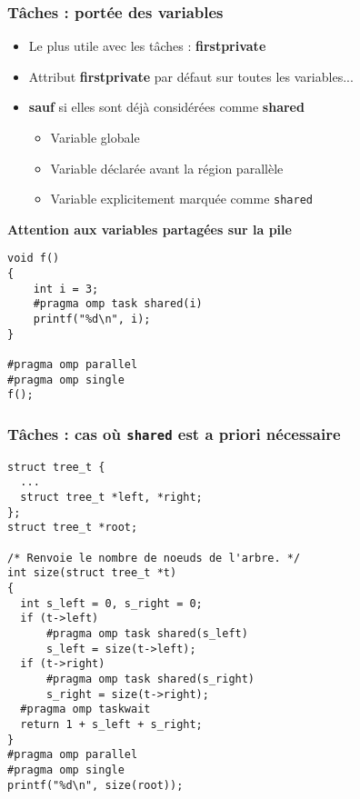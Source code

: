 \documentclass{beamer}
\begin{document}

\begin{frame}[fragile]
  \frametitle{Tâches : portée des variables}

  \begin{itemize}
  \item Le plus utile avec les tâches : \textbf{firstprivate}
  \item Attribut \textbf{firstprivate} par défaut sur toutes les variables...
  \item  \alert{\bf sauf} si elles sont déjà considérées comme \textbf{shared}
    \begin{itemize}
    \item Variable globale
    \item Variable déclarée avant la région parallèle
    \item Variable explicitement marquée comme \texttt{shared}
    \end{itemize}
  \end{itemize}

  \begin{alertblock}{\bf Attention aux variables partagées sur la pile}
\begin{verbatim}
void f()
{
    int i = 3;
    #pragma omp task shared(i)
    printf("%d\n", i);
}

#pragma omp parallel
#pragma omp single
f();
\end{verbatim}
  \end{alertblock}
\end{frame}


\begin{frame}[fragile]
  \frametitle{Tâches : cas où \texttt{shared} est a priori nécessaire}

\begin{verbatim}
struct tree_t {
  ...
  struct tree_t *left, *right;
};
struct tree_t *root;

/* Renvoie le nombre de noeuds de l'arbre. */
int size(struct tree_t *t)
{
  int s_left = 0, s_right = 0;
  if (t->left)
      #pragma omp task shared(s_left)
      s_left = size(t->left);
  if (t->right) 
      #pragma omp task shared(s_right)
      s_right = size(t->right);
  #pragma omp taskwait
  return 1 + s_left + s_right;
}
#pragma omp parallel
#pragma omp single
printf("%d\n", size(root));
\end{verbatim}
\end{frame}
\end{document}
